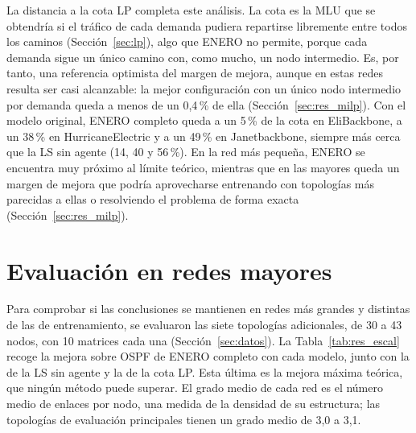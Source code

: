 La distancia a la cota LP completa este análisis. La cota es la MLU que se obtendría si el tráfico de cada demanda pudiera repartirse libremente entre todos los caminos (Sección~\ref{sec:lp}), algo que ENERO no permite, porque cada demanda sigue un único camino con, como mucho, un nodo intermedio. Es, por tanto, una referencia optimista del margen de mejora, aunque en estas redes resulta ser casi alcanzable: la mejor configuración con un único nodo intermedio por demanda queda a menos de un 0,4\,\% de ella (Sección~\ref{sec:res_milp}). Con el modelo original, ENERO completo queda a un 5\,\% de la cota en EliBackbone, a un 38\,\% en HurricaneElectric y a un 49\,\% en Janetbackbone, siempre más cerca que la LS sin agente (14, 40 y 56\,\%). En la red más pequeña, ENERO se encuentra muy próximo al límite teórico, mientras que en las mayores queda un margen de mejora que podría aprovecharse entrenando con topologías más parecidas a ellas o resolviendo el problema de forma exacta (Sección~\ref{sec:res_milp}).

\section{Evaluación en redes mayores}\label{sec:res_escalabilidad}\label{sec:res_tipo_red}\label{sec:res_mayores}

Para comprobar si las conclusiones se mantienen en redes más grandes y distintas de las de entrenamiento, se evaluaron las siete topologías adicionales, de 30 a 43 nodos, con 10 matrices cada una (Sección~\ref{sec:datos}). La Tabla~\ref{tab:res_escal} recoge la mejora sobre OSPF de ENERO completo con cada modelo, junto con la de la LS sin agente y la de la cota LP. Esta última es la mejora máxima teórica, que ningún método puede superar. El grado medio de cada red es el número medio de enlaces por nodo, una medida de la densidad de su estructura; las topologías de evaluación principales tienen un grado medio de 3,0 a 3,1.

